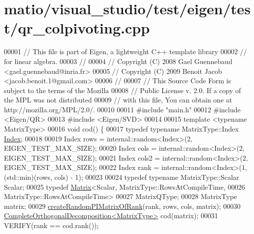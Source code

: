\hypertarget{matio_2visual__studio_2test_2eigen_2test_2qr__colpivoting_8cpp_source}{}\section{matio/visual\+\_\+studio/test/eigen/test/qr\+\_\+colpivoting.cpp}
\label{matio_2visual__studio_2test_2eigen_2test_2qr__colpivoting_8cpp_source}

\begin{DoxyCode}
00001 \textcolor{comment}{// This file is part of Eigen, a lightweight C++ template library}
00002 \textcolor{comment}{// for linear algebra.}
00003 \textcolor{comment}{//}
00004 \textcolor{comment}{// Copyright (C) 2008 Gael Guennebaud <gael.guennebaud@inria.fr>}
00005 \textcolor{comment}{// Copyright (C) 2009 Benoit Jacob <jacob.benoit.1@gmail.com>}
00006 \textcolor{comment}{//}
00007 \textcolor{comment}{// This Source Code Form is subject to the terms of the Mozilla}
00008 \textcolor{comment}{// Public License v. 2.0. If a copy of the MPL was not distributed}
00009 \textcolor{comment}{// with this file, You can obtain one at http://mozilla.org/MPL/2.0/.}
00010 
00011 \textcolor{preprocessor}{#include "main.h"}
00012 \textcolor{preprocessor}{#include <Eigen/QR>}
00013 \textcolor{preprocessor}{#include <Eigen/SVD>}
00014 
00015 \textcolor{keyword}{template} <\textcolor{keyword}{typename} MatrixType>
00016 \textcolor{keywordtype}{void} cod() \{
00017   \textcolor{keyword}{typedef} \textcolor{keyword}{typename} MatrixType::Index \hyperlink{namespace_eigen_a62e77e0933482dafde8fe197d9a2cfde}{Index};
00018 
00019   Index rows = internal::random<Index>(2, EIGEN\_TEST\_MAX\_SIZE);
00020   Index cols = internal::random<Index>(2, EIGEN\_TEST\_MAX\_SIZE);
00021   Index cols2 = internal::random<Index>(2, EIGEN\_TEST\_MAX\_SIZE);
00022   Index rank = internal::random<Index>(1, (std::min)(rows, cols) - 1);
00023 
00024   \textcolor{keyword}{typedef} \textcolor{keyword}{typename} MatrixType::Scalar Scalar;
00025   \textcolor{keyword}{typedef} \hyperlink{group___core___module_class_eigen_1_1_matrix}{Matrix}<Scalar, MatrixType::RowsAtCompileTime,
00026                  MatrixType::RowsAtCompileTime>
00027       MatrixQType;
00028   MatrixType matrix;
00029   \hyperlink{namespace_eigen_a0d9a7ddcee5c7c8defaba3628455efb2}{createRandomPIMatrixOfRank}(rank, rows, cols, matrix);
00030   \hyperlink{group___q_r___module_class_eigen_1_1_complete_orthogonal_decomposition}{CompleteOrthogonalDecomposition<MatrixType>} cod(matrix);
00031   VERIFY(rank == cod.rank());

\end{DoxyCode}
